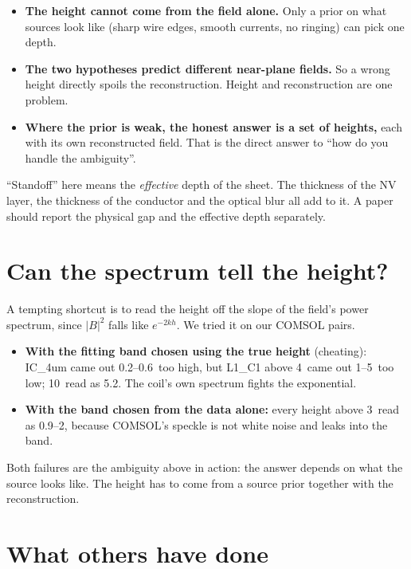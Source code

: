 \begin{keyidea}
\begin{itemize}
\item \textbf{The height cannot come from the field alone.} Only a prior on what sources look like (sharp wire edges,
smooth currents, no ringing) can pick one depth.
\item \textbf{The two hypotheses predict different near-plane fields.} So a wrong height directly spoils the
reconstruction. Height and reconstruction are one problem.
\item \textbf{Where the prior is weak, the honest answer is a set of heights,} each with its own reconstructed field.
That is the direct answer to ``how do you handle the ambiguity''.
\end{itemize}
\end{keyidea}

\begin{careful}
``Standoff'' here means the \emph{effective} depth of the sheet. The thickness of the NV layer, the thickness of the
conductor and the optical blur all add to it. A paper should report the physical gap and the effective depth separately.
\end{careful}

\section{Can the spectrum tell the height?}

A tempting shortcut is to read the height off the slope of the field's power spectrum, since $|B|^2$ falls like
$e^{-2kh}$. We tried it on our COMSOL pairs.
\begin{itemize}
\item \textbf{With the fitting band chosen using the true height} (cheating): IC\_4um came out 0.2--0.6\um\ too high, but
L1\_C1 above 4\um\ came out 1--5\um\ too low; 10\um\ read as 5.2\um. The coil's own spectrum fights the exponential.
\item \textbf{With the band chosen from the data alone:} every height above 3\um\ read as 0.9--2\um, because COMSOL's
speckle is not white noise and leaks into the band.
\end{itemize}
Both failures are the ambiguity above in action: the answer depends on what the source looks like. The height has to
come from a source prior together with the reconstruction.

\section{What others have done}

